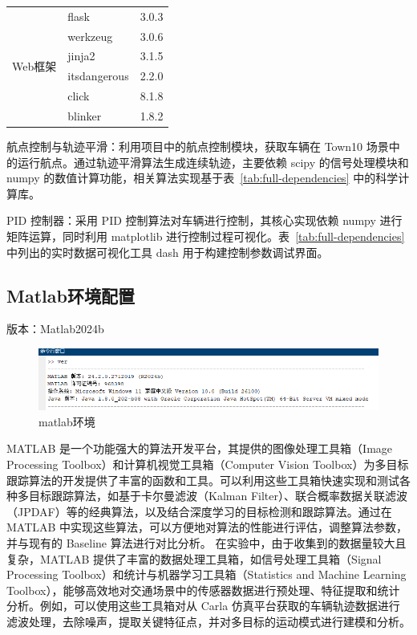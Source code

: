 \begin{table}[htbp]
\begin{tabular}{lll}
		\hline
		\multirow{6}{*}{Web框架}
		& flask & 3.0.3 \\
		& werkzeug & 3.0.6 \\
		& jinja2 & 3.1.5 \\
		& itsdangerous & 2.2.0 \\
		& click & 8.1.8 \\
		& blinker & 1.8.2 \\
		
		
		
		\hline
	\end{tabular}
\end{table}

航点控制与轨迹平滑：利用项目中的航点控制模块，获取车辆在 Town10 场景中的运行航点。通过轨迹平滑算法生成连续轨迹，主要依赖 scipy 的信号处理模块和 numpy 的数值计算功能，相关算法实现基于表~\ref{tab:full-dependencies} 中的科学计算库。

PID 控制器：采用 PID 控制算法对车辆进行控制，其核心实现依赖 numpy 进行矩阵运算，同时利用 matplotlib 进行控制过程可视化。表~\ref{tab:full-dependencies} 中列出的实时数据可视化工具 dash 用于构建控制参数调试界面\cite{方虹苏 2025 基于深度强化学习的智能汽车控制模型研究}。

\subsection{Matlab环境配置}

版本：Matlab2024b


\begin{figure}[htbp] %
	\centering
	\includegraphics[width=1\textwidth]{p7} %
	\caption{matlab环境} %
	\label{fig:p7} %
\end{figure}


MATLAB 是一个功能强大的算法开发平台，其提供的图像处理工具箱（Image Processing Toolbox）和计算机视觉工具箱（Computer Vision Toolbox）为多目标跟踪算法的开发提供了丰富的函数和工具。可以利用这些工具箱快速实现和测试各种多目标跟踪算法，如基于卡尔曼滤波（Kalman Filter）、联合概率数据关联滤波（JPDAF）等的经典算法，以及结合深度学习的目标检测和跟踪算法。通过在 MATLAB 中实现这些算法，可以方便地对算法的性能进行评估，调整算法参数，并与现有的 Baseline 算法进行对比分析。
在实验中，由于收集到的数据量较大且复杂，MATLAB 提供了丰富的数据处理工具箱，如信号处理工具箱（Signal Processing Toolbox）和统计与机器学习工具箱（Statistics and Machine Learning Toolbox），能够高效地对交通场景中的传感器数据进行预处理、特征提取和统计分析。例如，可以使用这些工具箱对从 Carla 仿真平台获取的车辆轨迹数据进行滤波处理，去除噪声，提取关键特征点，并对多目标的运动模式进行建模和分析\cite{穆凡 2025 神经先验增强的抗干扰鲁棒自动驾驶导航}。


